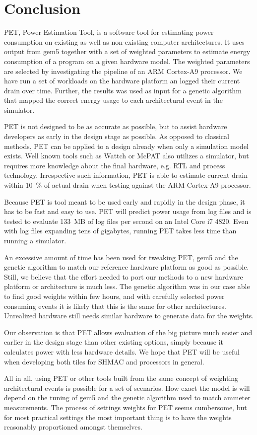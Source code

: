 \section{Conclusion}

PET, Power Estimation Tool, is a software tool for estimating power consumption
on existing as well as non-existing computer architectures.  It uses output from
gem5 together with a set of weighted parameters to estimate energy consumption
of a program on a given hardware model. The weighted parameters are selected by
investigating the pipeline of an ARM Cortex-A9 processor. We have run a set of
workloads on the hardware platform an logged their current drain over time.
Further, the results was used as input for a genetic algorithm that mapped the
correct energy usage to each architectural event in the simulator.

PET is not designed to be as accurate as possible, but to assist hardware
developers as early in the design stage as possible. As opposed to classical
methods, PET can be applied to a design already when only a simulation model
exists. Well known tools such as Wattch or McPAT also utilizes a simulator, but
requires more knowledge about the final hardware, e.g. RTL and process
technology. Irrespective such information, PET is able to estimate current drain
within 10~\% of actual drain when testing against the ARM Cortex-A9 processor.

Because PET is tool meant to be used early and rapidly in the design phase, it
has to be fast and easy to use. PET will predict power usage from log files and
is tested to evaluate 133~MB of log files per second on an Intel Core i7 4820.
Even with log files expanding tens of gigabytes, running PET takes less time
than running a simulator.

An excessive amount of time has been used for tweaking PET, gem5 and the genetic
algorithm to match our reference hardware platform as good as possible. Still,
we believe that the effort needed to port our methods to a new hardware platform
or architecture is much less. The genetic algorithm was in our case able to find
good weights within few hours, and with carefully selected power consuming
events it is likely that this is the same for other architectures. Unrealized
hardware still needs similar hardware to generate data for the weights.

Our observation is that PET allows evaluation of the big picture much easier and
earlier in the design stage than other existing options, simply because it
calculates power with less hardware details. We hope that PET will be useful
when developing both tiles for SHMAC and processors in general.

All in all, using PET or other tools built from the same concept of weighting
architectural events is possible for a set of scenarios. How exact the model is
will depend on the tuning of gem5 and the genetic algorithm used to match
ammeter measurements. The process of settings weights for PET seems cumbersome,
but for most practical settings the most important thing is to have the weights
reasonably proportioned amongst themselves.
